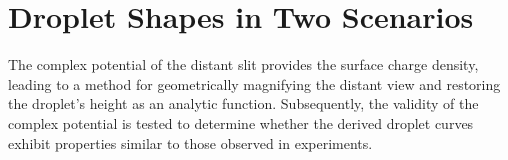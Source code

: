 \chapter{Droplet Shapes in Two Scenarios}
\hspace{0em}\indent The complex potential of the distant slit provides the surface charge density, leading to a method for geometrically magnifying the distant view and restoring the droplet's height as an analytic function. Subsequently, the validity of the complex potential is tested to determine whether the derived droplet curves exhibit properties similar to those observed in experiments.




\pagebreak
